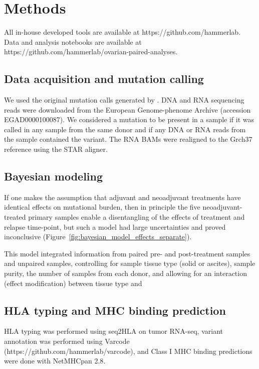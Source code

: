 \section*{Methods}
All in-house developed tools are available at https://github.com/hammerlab. Data and analysis notebooks are available at https://github.com/hammerlab/ovarian-paired-analyses.

\subsection*{Data acquisition and mutation calling}
We used the original mutation calls generated by \cite{Patch_2015}. DNA and RNA sequencing reads were downloaded from the European Genome-phenome Archive (accession EGAD0000100087). We considered a mutation to be present in a sample if it was called in any sample from the same donor and if any DNA or RNA reads from the sample contained the variant. The RNA BAMs were realigned to the Grch37 reference using the STAR aligner.

\subsection*{Bayesian modeling}
If one makes the assumption that adjuvant and neoadjuvant treatments have identical effects on mutational burden, then in principle the five neoadjuvant-treated primary samples enable a disentangling of the effects of treatment and relapse time-point, but such a model had large uncertainties and proved inconclusive (Figure~\ref{fig:bayesian_model_effects_separate}). 

This model integrated information from paired pre- and post-treatment samples and unpaired samples, controlling for sample tissue type (solid or ascites), sample purity, the number of samples from each donor, and allowing for an interaction (effect modification) between tissue type and 
 

\subsection*{HLA typing and MHC binding prediction}
HLA typing was performed using seq2HLA\cite{Boegel_2012} on tumor RNA-seq, variant annotation was performed using Varcode (https://github.com/hammerlab/varcode), and Class I MHC binding predictions were done with NetMHCpan 2.8\cite{Lundegaard_2008}.

